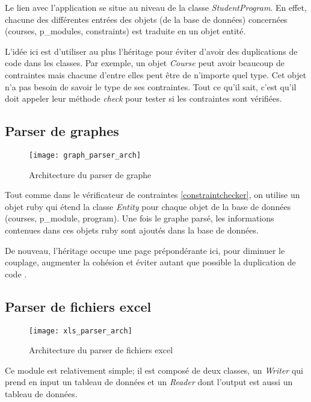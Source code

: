 Le lien avec l'application se situe au niveau de la classe \textit{StudentProgram}. En effet, chacune des différentes entrées des objets (de la base de données) concernées (courses, p\_modules, constraints) est traduite en un objet entité.

L'idée ici est d'utiliser au plus l'héritage pour éviter d'avoir des duplications de code dans les classes. Par exemple, un objet \textit{Course} peut avoir beaucoup de contraintes mais chacune d’entre elles peut être de n'importe quel type. Cet objet n'a pas besoin de savoir le type de ses contraintes. Tout ce qu'il sait, c'est qu'il doit appeler leur méthode \textit{check} pour tester si les contraintes sont vérifiées. 


\subsection{Parser de graphes}

\begin{figure}[H]
\centering
\caption{Architecture du parser de graphe}
\label{fig:graph_parser_arch}
\texttt{[image: graph\_parser\_arch]}
\end{figure}



Tout comme dans le vérificateur de contraintes \ref{constraintchecker}, on utilise un objet ruby qui étend la classe \textit{Entity} pour chaque objet de la base de données (courses, p\_module, program). Une fois le graphe parsé, les informations contenues dans ces objets ruby sont ajoutés dans la base de données. 

De nouveau, l'héritage occupe une page prépondérante ici, pour diminuer le couplage, augmenter la cohésion  et éviter autant que possible la duplication de code \cite{cohesion_couplage}. 

\subsection{Parser de fichiers excel}
\label{xls_parser}
\begin{figure}[H]
\centering
\caption{Architecture du parser de fichiers excel}
\label{xls_parser_arch}
\texttt{[image: xls\_parser\_arch]}
\end{figure}

Ce module est relativement simple; il est composé de deux classes, un \textit{Writer} qui prend en input un tableau de données et un \textit{Reader} dont l'output est aussi un tableau de données.


